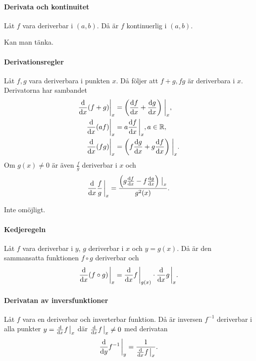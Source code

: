 \paragraph{Derivata och kontinuitet}
Låt $f$ vara deriverbar i $(a, b)$. Då är $f$ kontinuerlig i $(a, b)$.

\proof
Kan man tänka.

\paragraph{Derivationsregler}
Låt $f, g$ vara deriverbara i punkten $x$. Då följer att $f + g, fg$ är deriverbara i $x$. Derivatorna har sambandet
\begin{align*}
	\eval{\dv{x}(f + g)}_x &= \left(\dv{f}{x} + \dv{g}{x}\right)\eval_x, \\
	\eval{\dv{x}(af)}_x    &= a\dv{f}{x}\eval_x, a\in\R, \\
	\eval{\dv{x}(fg)}_x    &= \left(f\dv{g}{x} + g\dv{f}{x}\right)\eval_x. \\
\end{align*}
Om $g(x)\neq 0$ är även $\frac{f}{g}$ deriverbar i $x$ och
\begin{align*}
	\dv{x}\frac{f}{g}\eval_x = \frac{\left(g\dv{f}{x} - f\dv{g}{x}\right)\eval_x}{g^2(x)}.
\end{align*}

\proof
Inte omöjligt.

\paragraph{Kedjeregeln}
Låt $f$ vara deriverbar i $y$, $g$ deriverbar i $x$ och $y = g(x)$. Då är den sammansatta funktionen $f\circ g$ deriverbar och
\begin{align*}
	\dv{x}(f\circ g)\eval_x = \dv{x}f\eval_{g(x)}\cdot\dv{x}g\eval_x.
\end{align*}

\proof

\paragraph{Derivatan av inversfunktioner}
Låt $f$ vara en deriverbar och inverterbar funktion. Då är inversen $f^{-1}$ deriverbar i alla punkter $y = \dv{x}f\eval_x$ där $\dv{x}f\eval_x\neq 0$ med derivatan
\begin{align*}
	\dv{y}f^{-1}\eval_y = \frac{1}{\dv{x}f\eval_x}.
\end{align*}


